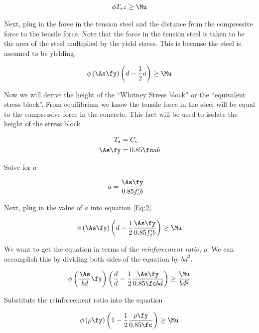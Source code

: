 \begin{align}
	\phi T_s z \geq \Mu
\end{align}

Next, plug in the force in the tension steel and the distance from the compressive force to the tensile force. Note that the force in the tension steel is taken to be the area of the steel multiplied by the yield stress. This is because the steel is assumed to be yielding.

\begin{align}
	\phi
	\left(\As \fy\right)
	\left(d-\frac{1}{2}a\right)
	\geq
	\Mu
	\label{Eq:2}
\end{align}

Now we will derive the height of the ``Whitney Stress block'' or the ``equivalent stress block''. From equilibrium we know the tensile force in the steel will be equal to the compressive force in the concrete. This fact will be used to isolate the height of the stress block

\begin{align}
	T_s &= C_c\\
	\As \fy &= 0.85 \fc ab
\end{align}

Solve for $a$

\begin{align}
	a&=\frac{\As \fy}{0.85f'_cb}
\end{align}


Next, plug in the value of $a$ into equation \ref{Eq:2}.

\begin{align}
	\phi
	\left(\As \fy\right)
	\left(d-\frac{1}{2}\frac{\As \fy}{0.85f'_cb}\right)
	\geq
	\Mu
\end{align}

We want to get the equation in terms of the \textit{reinforcement ratio}, $\rho$. We can accomplish this by dividing both sides of the equation by $bd^2$.


\begin{align}
	\phi
	\left(\frac{\As}{bd} \fy\right)
	\left(\frac{d}{d} - \frac12\frac{\As\fy}{0.85\fc bd}\right)
	\geq
	\frac{\Mu}{bd^2}
\end{align}


Substitute the reinforcement ratio into the equation

\begin{align}
	\phi
	\left(\rho \fy\right)
	\left(1 - \frac12\frac{\rho \fy}{0.85 \fc}\right)
	\geq
	\Mu
\end{align}



